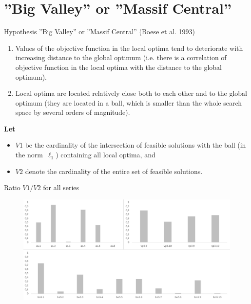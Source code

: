 \documentclass[aspectratio=169,xcolor=dvipsnames]{beamer}
\begin{document}
\section{''Big Valley'' or ''Massif Central''}

\begin{frame}{Hypothesis ''Big Valley'' or ''Massif Central''  (Boese et al.
1993)}
\begin{enumerate}
\item Values of the objective function in the local optima tend to deteriorate with increasing distance to the global optimum (i.e. there is a correlation 
of objective function in the local optima with the distance to the global optimum).
\vspace{0.5cm}	
\item Local optima are located relatively close both to each other and to the global optimum (they are located in a ball, which is smaller than 
the whole search space by several orders of magnitude).
\end{enumerate}

{\bf Let }
\begin{itemize}
\item $V1$ be the cardinality of the intersection of feasible solutions with the ball (in the norm~$\ell_1$) containing
all local optima, and 
\item $V2$ denote the cardinality of the entire set of feasible
solutions.
\end{itemize}
\end{frame}


\begin{frame}{Ratio $V1/V2$ for all series}
    \begin{figure}
    \includegraphics[scale=0.6]{volume}
    \end{figure}
\end{frame}
\end{document}

